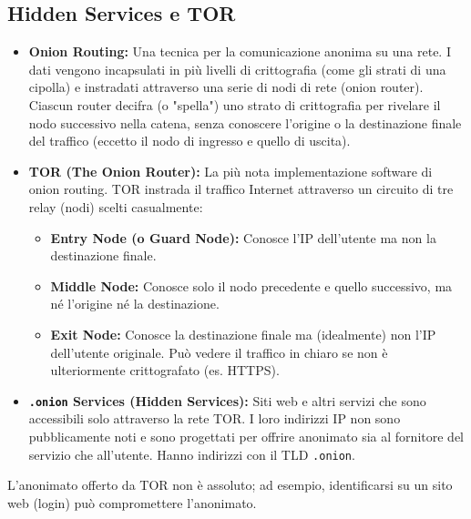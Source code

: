 \subsection{Hidden Services e TOR}
\begin{itemize}
    \item \textbf{Onion Routing:} Una tecnica per la comunicazione anonima su una rete. I dati vengono incapsulati in più livelli di crittografia (come gli strati di una cipolla) e instradati attraverso una serie di nodi di rete (onion router). Ciascun router decifra (o "spella") uno strato di crittografia per rivelare il nodo successivo nella catena, senza conoscere l'origine o la destinazione finale del traffico (eccetto il nodo di ingresso e quello di uscita).
    \item \textbf{TOR (The Onion Router):} La più nota implementazione software di onion routing. TOR instrada il traffico Internet attraverso un circuito di tre relay (nodi) scelti casualmente:
    \begin{itemize}
        \item \textbf{Entry Node (o Guard Node):} Conosce l'IP dell'utente ma non la destinazione finale.
        \item \textbf{Middle Node:} Conosce solo il nodo precedente e quello successivo, ma né l'origine né la destinazione.
        \item \textbf{Exit Node:} Conosce la destinazione finale ma (idealmente) non l'IP dell'utente originale. Può vedere il traffico in chiaro se non è ulteriormente crittografato (es. HTTPS).
    \end{itemize}
    \item \textbf{\texttt{.onion} Services (Hidden Services):} Siti web e altri servizi che sono accessibili solo attraverso la rete TOR. I loro indirizzi IP non sono pubblicamente noti e sono progettati per offrire anonimato sia al fornitore del servizio che all'utente. Hanno indirizzi con il TLD \texttt{.onion}.
\end{itemize}
L'anonimato offerto da TOR non è assoluto; ad esempio, identificarsi su un sito web (login) può compromettere l'anonimato.

